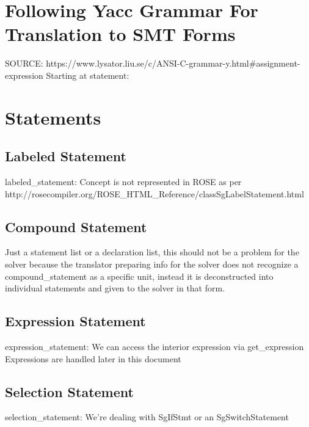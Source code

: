 \documentclass[11pt]{article}
\begin{document}
{\begin{enumeration}
\section{Following Yacc Grammar For Translation to SMT Forms}
SOURCE: https://www.lysator.liu.se/c/ANSI-C-grammar-y.html#assignment-expression
Starting at statement:
\section{Statements}
\subsection{Labeled Statement}
labeled\_statement:
Concept is not represented in ROSE as per\\
http://rosecompiler.org/ROSE\_HTML\_Reference/classSgLabelStatement.html\\
\subsection{Compound Statement}
Just a statement list or a declaration list, this should not be a problem for the solver because the translator preparing info for the solver does not recognize a compound\_statement as a specific unit, instead it is deconstructed into individual statements and given to the solver in that form.\\
\subsection{Expression Statement}
expression\_statement:
We can access the interior expression via
get\_expression
Expressions are handled later in this document
\subsection{Selection Statement}
selection\_statement:
We're dealing with SgIfStmt or an SgSwitchStatement

\end{enumeration}}
\end{document}
